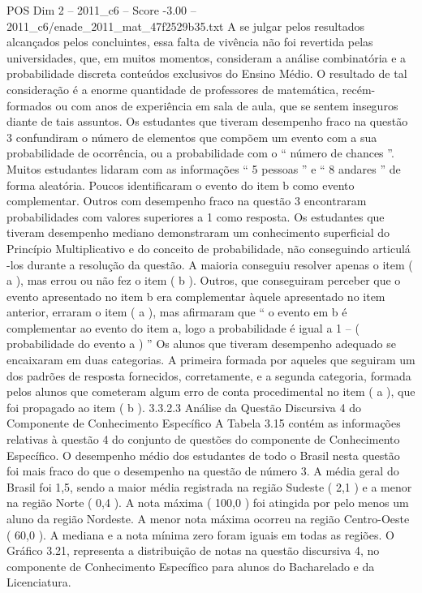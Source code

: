 \begin{textsample}{POS Dim 2 – 2011\_c6 – Score -3.00 – 2011\_c6/enade\_2011\_mat\_47f2529b35.txt}
A se julgar pelos resultados alcançados pelos concluintes, essa falta de vivência não foi revertida pelas universidades, que, em muitos momentos, consideram a análise combinatória e a probabilidade discreta conteúdos exclusivos do Ensino Médio.
O resultado de tal consideração é a enorme quantidade de professores de matemática, recém-formados ou com anos de experiência em sala de aula, que se sentem inseguros diante de tais assuntos.
Os estudantes que tiveram desempenho fraco na questão 3 confundiram o número de elementos que compõem um evento com a sua probabilidade de ocorrência, ou a probabilidade com o “ número de chances ”.
Muitos estudantes lidaram com as informações “ 5 pessoas ” e “ 8 andares ” de forma aleatória.
Poucos identificaram o evento do item b como evento complementar.
Outros com desempenho fraco na questão 3 encontraram probabilidades com valores superiores a 1 como resposta.
Os estudantes que tiveram desempenho mediano demonstraram um conhecimento superficial do Princípio Multiplicativo e do conceito de probabilidade, não conseguindo articulá -los durante a resolução da questão.
A maioria conseguiu resolver apenas o item ( a ), mas errou ou não fez o item ( b ).
Outros, que conseguiram perceber que o evento apresentado no item b era complementar àquele apresentado no item anterior, erraram o item ( a ), mas afirmaram que “ o evento em b é complementar ao evento do item a, logo a probabilidade é igual a 1 – ( probabilidade do evento a ) ” Os alunos que tiveram desempenho adequado se encaixaram em duas categorias.
A primeira formada por aqueles que seguiram um dos padrões de resposta fornecidos, corretamente, e a segunda categoria, formada pelos alunos que cometeram algum erro de conta procedimental no item ( a ), que foi propagado ao item ( b ). 3.3.2.3 Análise da Questão Discursiva 4 do Componente de Conhecimento Específico A Tabela 3.15 contém as informações relativas à questão 4 do conjunto de questões do componente de Conhecimento Específico.
O desempenho médio dos estudantes de todo o Brasil nesta questão foi mais fraco do que o desempenho na questão de número 3.
A média geral do Brasil foi 1,5, sendo a maior média registrada na região Sudeste ( 2,1 ) e a menor na região Norte ( 0,4 ).
A nota máxima ( 100,0 ) foi atingida por pelo menos um aluno da região Nordeste.
A menor nota máxima ocorreu na região Centro-Oeste ( 60,0 ).
A mediana e a nota mínima zero foram iguais em todas as regiões.
O Gráfico 3.21, representa a distribuição de notas na questão discursiva 4, no componente de Conhecimento Específico para alunos do Bacharelado e da Licenciatura.

\end{textsample}
